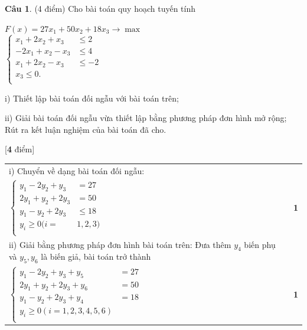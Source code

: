 \documentclass[12pt,a4letter]{article}
\theoremstyle{definition}
\newtheorem{cauhoi}{Câu}
\newenvironment{phandiem}{%
\par\noindent
\begin{longtable}[t]{|p{15cm}|p{1.2cm}|}
\hline
}{%
\end{longtable}
}
\newcommand\diem[1]{ & \hfil \textbf{#1} \\ \hline}
\newcommand\tongdiem[1]{\hfill [\textbf{#1} điểm]}
\begin{document}
\begin{cauhoi}%
(4 điểm)  
Cho bài toán quy hoạch tuyến tính
\begin{center}
$ F(x)=27x_1+50x_2+18x_3\rightarrow\max $ \\
 $ \begin{cases}
x_1+2x_2+x_3&\le 2\\ 
-2x_1+x_2-x_3&\le 4\\ 
x_1+2x_2-x_3&\le -2\\ 
x_3\le 0.&\\ 
\end{cases} $
\end{center}

i) Thiết lập bài toán đối ngẫu với bài toán trên;

ii) Giải bài toán đối ngẫu vừa thiết lập bằng phương pháp đơn hình mở rộng; Rút ra kết luận nghiệm của bài toán đã cho.

\begin{traloi}\tongdiem{4}
\begin{phandiem}
i) Chuyển về dạng bài toán đối ngẫu:  
\begin{center}
$L(y)=2y_1+4y_2-2y_3\rightarrow\min$\\
$\begin{cases}
y_1-2y_2+y_3&= 27\\ 
2y_1+y_2+2y_3&=50\\ 
y_1-y_2+2y_3&\le 18\\ 
y_i\ge 0 (i=&1,2,3)\\ 
\end{cases} $
\end{center}
\diem{1}

ii) Giải bằng phương pháp đơn hình bài toán trên: Đưa thêm 
	$y_4$ biến phụ và $y_5, y_6$ là biến giả, bài toán trở thành

\begin{center}
$L(y)=2y_1+4y_2-2y_3+My_5+My_6\rightarrow\min$\\
$\begin{cases}
y_1-2y_2+y_3+y_5&= 27\\ 
2y_1+y_2+2y_3+y_6&=50\\ 
y_1-y_2+2y_3+y_4&= 18\\ 
y_i\ge 0 (i=1,2,3,4,5,6)&\\ 
\end{cases} $
\end{center}
\diem{1}


\end{phandiem}
\end{traloi}
\end{cauhoi}
\end{document}
